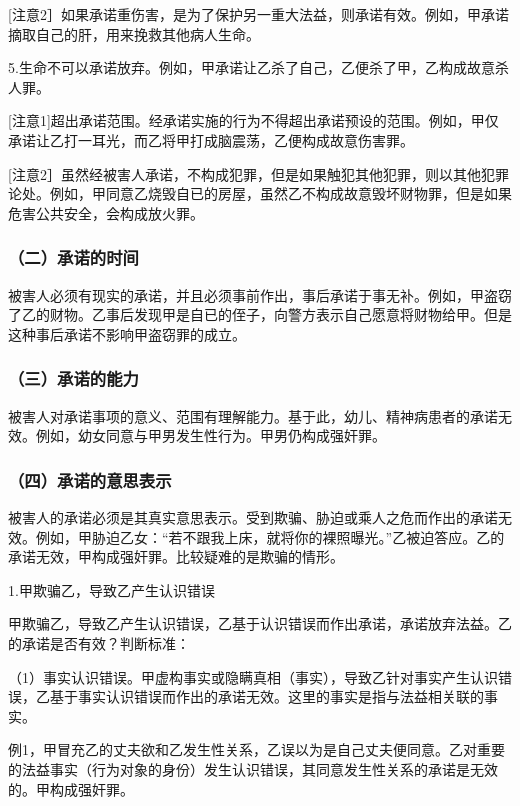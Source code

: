 [注意2］如果承诺重伤害，是为了保护另一重大法益，则承诺有效。例如，甲承诺摘取自己的肝，用来挽救其他病人生命。

5.生命不可以承诺放弃。例如，甲承诺让乙杀了自己，乙便杀了甲，乙构成故意杀人罪。

[注意1]超出承诺范围。经承诺实施的行为不得超出承诺预设的范围。例如，甲仅承诺让乙打一耳光，而乙将甲打成脑震荡，乙便构成故意伤害罪。

[注意2］虽然经被害人承诺，不构成犯罪，但是如果触犯其他犯罪，则以其他犯罪论处。例如，甲同意乙烧毁自已的房屋，虽然乙不构成故意毁坏财物罪，但是如果危害公共安全，会构成放火罪。

\subsubsection*{（二）承诺的时间}

被害人必须有现实的承诺，并且必须事前作出，事后承诺于事无补。例如，甲盗窃了乙的财物。乙事后发现甲是自已的侄子，向警方表示自己愿意将财物给甲。但是这种事后承诺不影响甲盗窃罪的成立。

\subsubsection*{（三）承诺的能力}

被害人对承诺事项的意义、范围有理解能力。基于此，幼儿、精神病患者的承诺无效。例如，幼女同意与甲男发生性行为。甲男仍构成强奸罪。

\subsubsection*{（四）承诺的意思表示}

被害人的承诺必须是其真实意思表示。受到欺骗、胁迫或乘人之危而作出的承诺无效。例如，甲胁迫乙女：“若不跟我上床，就将你的裸照曝光。”乙被迫答应。乙的承诺无效，甲构成强奸罪。比较疑难的是欺骗的情形。

1.甲欺骗乙，导致乙产生认识错误

甲欺骗乙，导致乙产生认识错误，乙基于认识错误而作出承诺，承诺放弃法益。乙的承诺是否有效？判断标准：

（1）事实认识错误。甲虚构事实或隐瞒真相（事实），导致乙针对事实产生认识错误，乙基于事实认识错误而作出的承诺无效。这里的事实是指与法益相关联的事实。

例1，甲冒充乙的丈夫欲和乙发生性关系，乙误以为是自己丈夫便同意。乙对重要的法益事实（行为对象的身份）发生认识错误，其同意发生性关系的承诺是无效的。甲构成强奸罪。

